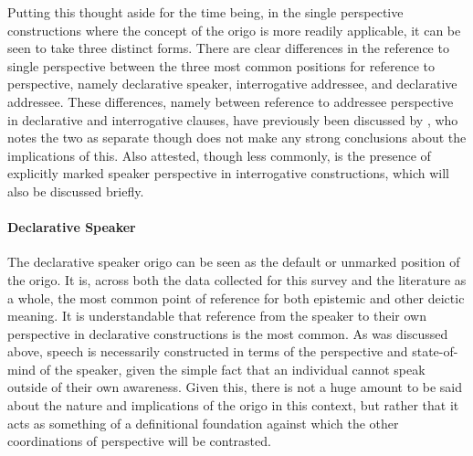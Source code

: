 Putting this thought aside for the time being, in the single perspective constructions where the concept of the origo is more readily applicable, it can be seen to take three distinct forms. There are clear differences in the reference to single perspective between the three most common positions for reference to perspective, namely declarative speaker, interrogative addressee, and declarative addressee. These differences, namely between reference to addressee perspective in declarative and interrogative clauses, have previously been discussed by , who notes the two as separate though does not make any strong conclusions about the implications of this. Also attested, though less commonly, is the presence of explicitly marked speaker perspective in interrogative constructions, which will also be discussed briefly.

\paragraph{Declarative Speaker}
The declarative speaker origo can be seen as the default or unmarked position of the origo. It is, across both the data collected for this survey and the literature as a whole, the most common point of reference for both epistemic and other deictic meaning. It is understandable that reference from the speaker to their own perspective in declarative constructions is the most common. As was discussed above, speech is necessarily constructed in terms of the perspective and state-of-mind of the speaker, given the simple fact that an individual cannot speak outside of their own awareness. Given this, there is not a huge amount to be said about the nature and implications of the origo in this context, but rather that it acts as something of a definitional foundation against which the other coordinations of perspective will be contrasted.
